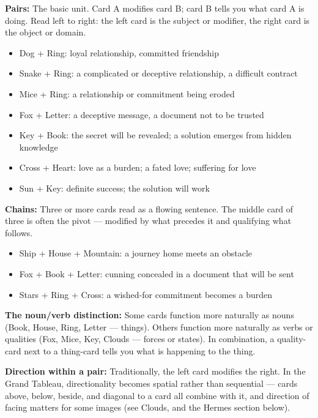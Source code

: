 \textbf{Pairs:} The basic unit. Card A modifies card B; card B tells you what card A is doing. Read left to right: the left card is the subject or modifier, the right card is the object or domain.

\begin{itemize}
\tightlist
\item
  Dog + Ring: loyal relationship, committed friendship
\item
  Snake + Ring: a complicated or deceptive relationship, a difficult contract
\item
  Mice + Ring: a relationship or commitment being eroded
\item
  Fox + Letter: a deceptive message, a document not to be trusted
\item
  Key + Book: the secret will be revealed; a solution emerges from hidden knowledge
\item
  Cross + Heart: love as a burden; a fated love; suffering for love
\item
  Sun + Key: definite success; the solution will work
\end{itemize}

\textbf{Chains:} Three or more cards read as a flowing sentence. The middle card of three is often the pivot --- modified by what precedes it and qualifying what follows.

\begin{itemize}
\tightlist
\item
  Ship + House + Mountain: a journey home meets an obstacle
\item
  Fox + Book + Letter: cunning concealed in a document that will be sent
\item
  Stars + Ring + Cross: a wished-for commitment becomes a burden
\end{itemize}

\textbf{The noun/verb distinction:} Some cards function more naturally as nouns (Book, House, Ring, Letter --- things). Others function more naturally as verbs or qualities (Fox, Mice, Key, Clouds --- forces or states). In combination, a quality-card next to a thing-card tells you what is happening to the thing.

\textbf{Direction within a pair:} Traditionally, the left card modifies the right. In the Grand Tableau, directionality becomes spatial rather than sequential --- cards above, below, beside, and diagonal to a card all combine with it, and direction of facing matters for some images (see Clouds, and the Hermes section below).

